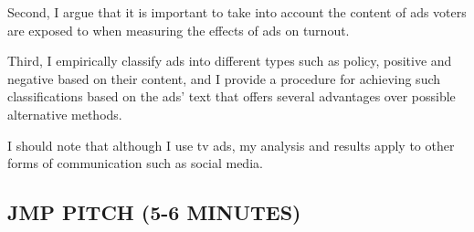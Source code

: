 \documentclass[12pt]{article}
\theoremstyle{plain}
\theoremstyle{plain}
\theoremstyle{plain}
\theoremstyle{plain}
\theoremstyle{plain}
\theoremstyle{plain}
\begin{document}
Second, I argue that it is important to take into account the content of ads voters are exposed to when measuring the effects of ads on turnout.

Third, I empirically classify ads into different types such as policy, positive and negative based on their content,
and I provide a procedure for achieving such classifications based on the ads' text that offers several advantages over possible alternative methods.


I should note that although I use tv ads, my analysis and results apply to other forms of communication such as social media.


\subsection{JMP PITCH (5-6 MINUTES)}
\label{sec:org4c2f80f}
\end{document}

